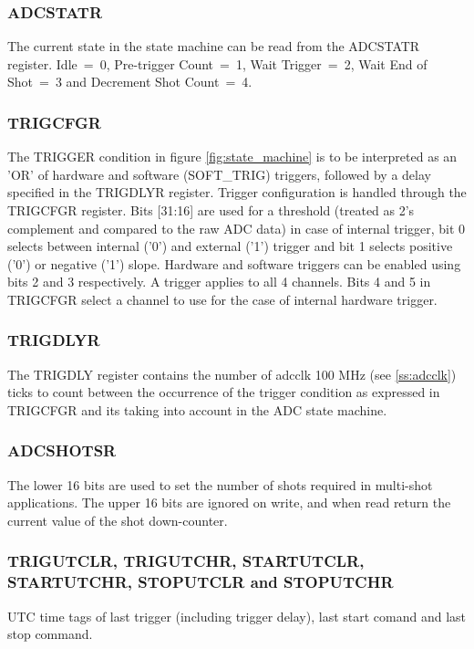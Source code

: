 \documentclass[a4paper]{article}
\begin{document}
\subsubsection{ADCSTATR}
The current state in the state machine can be read from the ADCSTATR register. Idle~=~0, Pre-trigger Count~=~1, Wait Trigger~=~2, Wait End of Shot~=~3 and Decrement Shot Count~=~4.

\subsubsection{TRIGCFGR}
The TRIGGER condition in figure \ref{fig:state_machine} is to be interpreted as an 'OR' of hardware and software (SOFT\_TRIG) triggers, followed by a delay specified in the TRIGDLYR register. Trigger configuration is handled through the TRIGCFGR register. Bits [31:16] are used for a threshold (treated as 2's complement and compared to the raw ADC data) in case of internal trigger, bit 0 selects between internal ('0') and external ('1') trigger and bit 1 selects positive ('0') or negative ('1') slope. Hardware and software triggers can be enabled using bits 2 and 3 respectively. A trigger applies to all 4 channels. Bits 4 and 5 in TRIGCFGR select a channel to use for the case of internal hardware trigger.  

\subsubsection{TRIGDLYR}
The TRIGDLY register contains the number of adcclk 100 MHz (see \ref{ss:adcclk}) ticks to count between the occurrence of the trigger condition as expressed in TRIGCFGR and its taking into account in the ADC state machine. 

\subsubsection{ADCSHOTSR}
The lower 16 bits are used to set the number of shots required in multi-shot applications. The upper 16 bits are ignored on write, and when read return the current value of the shot down-counter.

\subsubsection{TRIGUTCLR, TRIGUTCHR, STARTUTCLR, \\STARTUTCHR, STOPUTCLR and STOPUTCHR}
UTC time tags of last trigger (including trigger delay), last start comand and last stop command.
\end{document}
